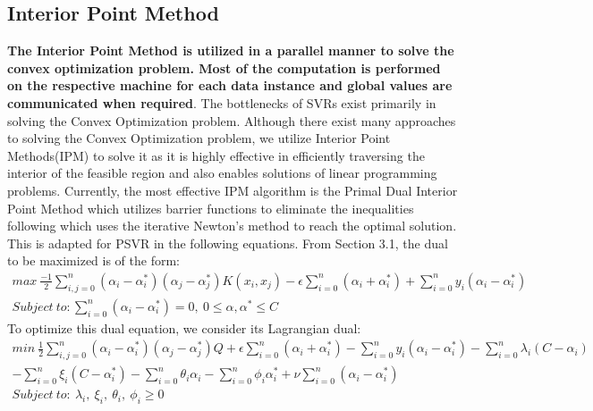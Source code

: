 \documentclass[12pt]{article}
\begin{document}
 \subsection{Interior Point Method}
 \label{Interior Point Method}
  {\bf The Interior Point Method is utilized in a parallel manner to solve the convex optimization problem. Most of the computation is performed on the respective machine for each data instance and global values are communicated when required}.
  \newline\newline
 The bottlenecks of SVRs exist primarily in solving the Convex Optimization problem. Although there exist many approaches to solving the Convex Optimization problem, we utilize Interior Point Methods(IPM) to solve it as it is highly effective in efficiently traversing the interior of the feasible region and also enables solutions of linear programming problems.
\newline
Currently, the most effective IPM algorithm is the Primal Dual Interior Point Method which utilizes barrier functions to eliminate the inequalities following which uses the iterative Newton's method to reach the optimal solution.
\newline
 This is adapted for PSVR in the following equations.
 \newline\newline
From Section 3.1, the dual to be maximized is of the form: 
\begin{gather*} 
 max\  \frac{-1}{2}\sum_{i, j=0}^{n}{(\alpha_{i} - \alpha_{i}^*)(\alpha_{j} - \alpha_{j}^*)K(x_{i}, x_{j})} - \epsilon\sum_{i=0}^{n}{(\alpha_{i} + \alpha_{i}^*)}+\sum_{i=0}^{n}{y_{i}(\alpha_{i} - \alpha_{i}^*)}   \\
 Subject \ to: \sum_{i=0}^{n}{(\alpha_{i} - \alpha_{i}^*)} = 0, \ 0\leq\alpha, \alpha^*\leq C
 \end{gather*}
 \newline
To optimize this dual equation, we consider its Lagrangian dual:
 \begin{gather*} 
min\  \frac{1}{2}\sum_{i, j=0}^{n}{(\alpha_{i} - \alpha_{i}^*)(\alpha_{j} - \alpha_{j}^*)Q} + \epsilon\sum_{i=0}^{n}{(\alpha_{i} + \alpha_{i}^*)}-\sum_{i=0}^{n}{y_{i}(\alpha_{i} - \alpha_{i}^*)}-\sum_{i=0}^{n}{\lambda_{i}(C-\alpha_{i})}\\-\sum_{i=0}^{n}{\xi_{i}(C-\alpha^*_{i})}-\sum_{i=0}^{n}{\theta_{i}\alpha_{i}}-\sum_{i=0}^{n}{\phi_{i}\alpha^*_{i}}+\nu\sum_{i=0}^{n}{(\alpha_{i} - \alpha_{i}^*)}\\
Subject \ to:\ \lambda_{i},\ \xi_{i},\ \theta_{i},\ \phi_{i} \geq 0
 \end{gather*}
\end{document}
